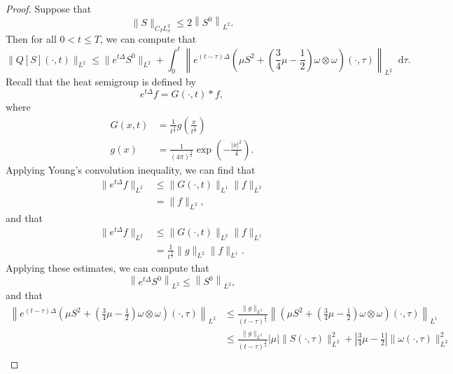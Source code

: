 \documentclass[11pt]{article}
\theoremstyle{plain}
\theoremstyle{remark}
\numberwithin{equation}{section}
\newcommand{\diff}{\mathop{}\!\mathrm{d}}
\begin{document}
\begin{proof}
Suppose that
\begin{equation}
    \|S\|_{C_T L^2_x}
    \leq 
    2\left\|S^0\right\|_{L^2}.
\end{equation}
Then for all $0<t\leq T$,
we can compute that
\begin{equation}
    \|Q[S](\cdot,t)\|_{L^2}
    \leq 
    \|e^{t\Delta} S^0\|_{L^2}
    +\int_0^t \left\|
     e^{(t-\tau)\Delta}
    \left(\mu S^2+ 
    \left(\frac{3}{4}\mu-\frac{1}{2}\right)
\omega\otimes\omega \right)(\cdot,\tau)
    \right\|_{L^2} \diff\tau.
\end{equation}
Recall that the heat semigroup is defined by
\begin{equation}
    e^{t\Delta}f=
    G(\cdot,t)*f,
\end{equation}
where
\begin{align}
    G(x,t)
    &=
    \frac{1}{t^\frac{3}{2}}
    g\left(\frac{x}{t^\frac{1}{2}}
    \right) \\
    g(x)
    &=
    \frac{1}{(4\pi)^\frac{3}{2}}
    \exp\left(-\frac{|x|^2}{4}\right).
\end{align}
Applying Young's convolution inequality, we can find that
\begin{align}
    \|e^{t\Delta}f\|_{L^2}
    &\leq 
    \|G(\cdot,t)\|_{L^1} \|f\|_{L^2} \\
    &=
    \|f\|_{L^2},
\end{align}
and that
\begin{align}
    \|e^{t\Delta}f\|_{L^2}
    &\leq 
    \|G(\cdot,t)\|_{L^2} \|f\|_{L^1} \\
    &=
    \frac{1}{t^\frac{3}{4}} 
    \|g\|_{L^2}\|f\|_{L^1}.
\end{align}
Applying these estimates, we can compute that
\begin{equation}
    \left\|e^{t\Delta} S^0\right\|_{L^2}
    \leq 
    \left\|S^0\right\|_{L^2},
\end{equation}
and that
\begin{align} 
    \left\|
     e^{(t-\tau)\Delta}
    \left(\mu S^2+ 
    \left(\frac{3}{4}\mu-\frac{1}{2}\right)
\omega\otimes\omega \right)(\cdot,\tau)
    \right\|_{L^2}
    &\leq 
    \frac{\|g\|_{L^2}}{(t-\tau)^\frac{3}{4}}
    \left\|\left(\mu S^2+ 
    \left(\frac{3}{4}\mu-\frac{1}{2}\right)
    \omega\otimes\omega 
    \right)(\cdot,\tau)\right\|_{L^1} \\
    &\leq 
    \frac{\|g\|_{L^2}}{(t-\tau)^\frac{3}{4}}
    |\mu|\|S(\cdot,\tau)\|_{L^2}^2
    +\left|\frac{3}{4}\mu-\frac{1}{2}\right|
    \|\omega(\cdot,\tau)\|_{L^2}^2 \\

\end{align}
\end{proof}
\end{document}
